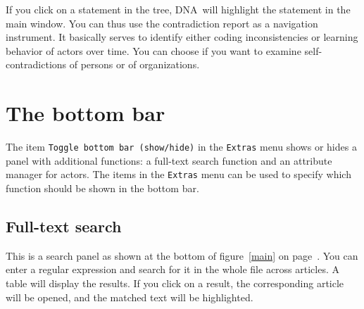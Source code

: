 \documentclass[12pt,a4paper]{scrreprt}
\newcommand{\dnashort}{\textsc{DNA}}
\newcommand{\code}[1]{\texttt{#1}}
\begin{document}
If you click on a statement in the tree, \dnashort\ will highlight the statement in the main window. You can thus use the contradiction report as a navigation instrument. It basically serves to identify either coding inconsistencies or learning behavior of actors over time. You can choose if you want to examine self-contradictions of persons or of organizations.

\section{The bottom bar}
The item \code{Toggle bottom bar (show/hide)} in the \code{Extras} menu shows or hides a panel with additional functions: a full-text search function and an attribute manager for actors. The items in the \code{Extras} menu can be used to specify which function should be shown in the bottom bar.

\subsection{Full-text search}\label{search}
This is a search panel as shown at the bottom of figure~\ref{main} on page~\pageref{main}. You can enter a regular expression and search for it in the whole file across articles. A table will display the results. If you click on a result, the corresponding article will be opened, and the matched text will be highlighted.
\end{document}
